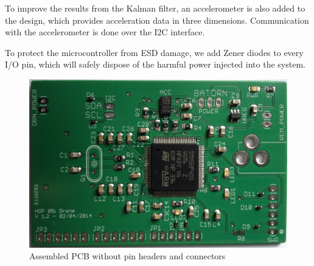 \documentclass[a4paper]{article}        %
\begin{document}
  To improve the results from the Kalman filter, an accelerometer is also added to the design, which provides acceleration data in three dimensions. Communication with the accelerometer is done over the I2C interface.

  To protect the microcontroller from ESD damage, we add Zener diodes to every I/O pin, which will safely dispose of the harmful power injected into the system.

  \begin{figure}[H]
    \begin{center}
      \includegraphics[width=\textwidth]{images/final_pcb_result.eps}
      \caption{Assembled PCB without pin headers and connectors}
      \label{fig:final_pcb}
    \end{center}
  \end{figure}
  
\end{document}
